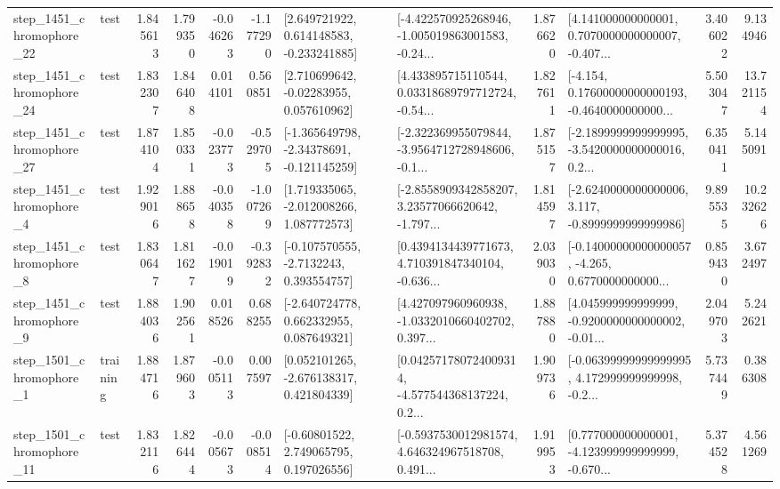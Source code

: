 \begin{tabular}{llrrrrllrlrr}
 step\_1451\_chromophore\_22 &      test &      1.845613 &    1.799350 &     -0.046263 & -1.177290 &    [2.649721922, 0.614148583, -0.233241885] &  [-4.422570925268946, -1.005019863001583, -0.24... &       1.876620 &  [4.141000000000001, 0.7070000000000007, -0.407... &            3.406022 &          9.134946 \\
 step\_1451\_chromophore\_24 &      test &      1.832307 &    1.846408 &      0.014101 &  0.560851 &     [2.710699642, -0.02283955, 0.057610962] &  [4.433895715110544, 0.03318689797712724, -0.54... &       1.827611 &  [-4.154, 0.17600000000000193, -0.4640000000000... &            5.503047 &         13.721154 \\
 step\_1451\_chromophore\_27 &      test &      1.874104 &    1.850331 &     -0.023773 & -0.529705 &   [-1.365649798, -2.34378691, -0.121145259] &  [-2.322369955079844, -3.9564712728948606, -0.1... &       1.875157 &  [-2.1899999999999995, -3.5420000000000016, 0.2... &            6.350411 &          5.145091 \\
  step\_1451\_chromophore\_4 &      test &      1.929016 &    1.888658 &     -0.040358 & -1.007269 &    [1.719335065, -2.012008266, 1.087772573] &  [-2.8558909342858207, 3.23577066620642, -1.797... &       1.814597 &  [-2.6240000000000006, 3.117, -0.8999999999999986] &            9.895535 &         10.232626 \\
  step\_1451\_chromophore\_8 &      test &      1.830647 &    1.811627 &     -0.019019 & -0.392832 &     [-0.107570555, -2.7132243, 0.393554757] &  [0.4394134439771673, 4.710391847340104, -0.636... &       2.039030 &  [-0.14000000000000057, -4.265, 0.6770000000000... &            0.859430 &          3.672497 \\
  step\_1451\_chromophore\_9 &      test &      1.884036 &    1.902561 &      0.018526 &  0.688255 &    [-2.640724778, 0.662332955, 0.087649321] &  [4.427097960960938, -1.0332010660402702, 0.397... &       1.887880 &  [4.045999999999999, -0.9200000000000002, -0.01... &            2.049703 &          5.242621 \\
  step\_1501\_chromophore\_1 &  training &      1.884716 &    1.879603 &     -0.005113 &  0.007597 &    [0.052101265, -2.676138317, 0.421804339] &  [0.042571780724009314, -4.577544368137224, 0.2... &       1.909736 &  [-0.06399999999999995, 4.172999999999998, -0.2... &            5.737449 &          0.386308 \\
 step\_1501\_chromophore\_11 &      test &      1.832116 &    1.826444 &     -0.005673 & -0.008514 &     [-0.60801522, 2.749065795, 0.197026556] &  [-0.5937530012981574, 4.646324967518708, 0.491... &       1.919953 &  [0.777000000000001, -4.123999999999999, -0.670... &            5.374528 &          4.561269 \\

\end{tabular}
